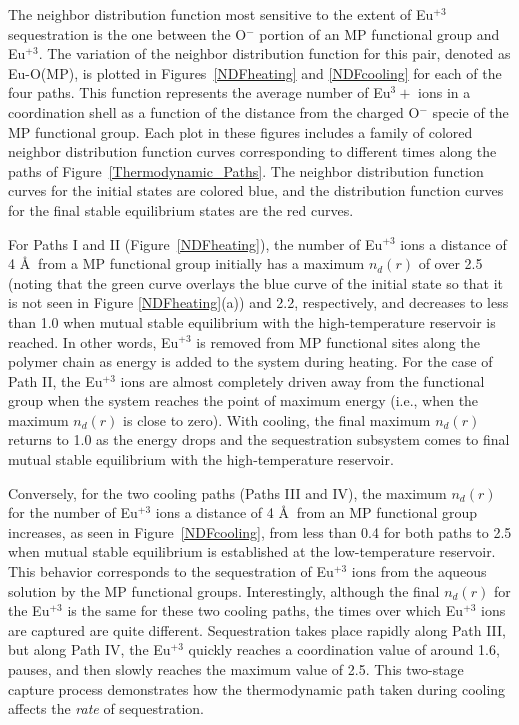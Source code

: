 \documentclass[
journal=jcisd8, %
manuscript=article,
layout=twocolumn   %
]{achemso}
\begin{document}
The neighbor distribution function most sensitive to the extent of Eu$^{+3}$ sequestration is the one between the O$^-$ portion of an MP functional group and Eu$^{+3}$.  The variation of the neighbor distribution function for this pair, denoted as Eu-O(MP), is plotted in Figures~\ref{NDFheating} and \ref{NDFcooling} for each of the four paths. This function represents the average number of Eu$^3+$ ions in a coordination shell as a function of the distance from the charged O$^-$ specie of the MP functional group. Each plot in these figures includes a family of colored neighbor distribution function curves corresponding to different times along the paths of Figure~\ref{Thermodynamic_Paths}. The neighbor distribution function curves for the initial states are colored blue, and the distribution function curves for the final stable equilibrium states are the red curves.

For Paths I and II (Figure~\ref{NDFheating}), the number of Eu$^{+3}$ ions a distance of 4 \AA $\:$ from a MP functional group initially has a maximum $n_d(r)$ of over 2.5 (noting that the green curve overlays the blue curve of the initial state so that it is not seen in Figure \ref{NDFheating}(a)) and 2.2, respectively, and decreases to less than 1.0 when mutual stable equilibrium with the high-temperature reservoir is reached. In other words, Eu$^{+3}$ is removed from MP functional sites along the polymer chain as energy is added to the system during heating.  For the case of Path II, the Eu$^{+3}$ ions are almost completely driven away from the functional group when the system reaches the point of maximum energy (i.e., when the maximum $n_d(r)$ is close to zero). With cooling, the final maximum $n_d(r)$ returns to 1.0 as the energy drops and the sequestration subsystem comes to final mutual stable equilibrium with the high-temperature reservoir.

Conversely, for the two cooling paths (Paths III and IV), the maximum $n_d(r)$ for the number of Eu$^{+3}$ ions a distance of 4 \AA $\:$ from an MP functional group increases, as seen in Figure~\ref{NDFcooling}, from less than 0.4 for both paths to 2.5 when mutual stable equilibrium is established at the low-temperature reservoir. This behavior corresponds to the sequestration of Eu$^{+3}$ ions from the aqueous solution by the MP functional groups. Interestingly, although the final $n_d(r)$ for the Eu$^{+3}$ is the same for these two cooling paths, the times over which Eu$^{+3}$ ions are captured are quite different. Sequestration takes place rapidly along Path III, but along Path IV, the Eu$^{+3}$ quickly reaches a  coordination value of around 1.6, pauses, and then slowly reaches the maximum value of 2.5.  This two-stage capture process demonstrates how the thermodynamic path taken during cooling affects the {\em rate} of sequestration. 
\end{document}
